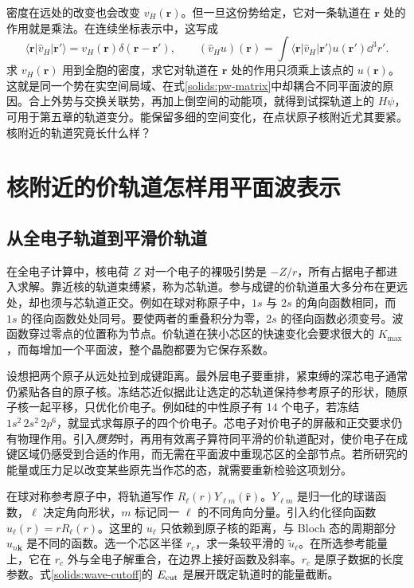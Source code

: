 密度在远处的改变也会改变 $v_H(\bm r)$。但一旦这份势给定，它对一条轨道在 $\bm r$ 处的作用就是乘法。在连续坐标表示中，这写成
\begin{equation}
 \langle\bm r|\hat v_H|\bm r'\rangle=v_H(\bm r)\delta(\bm r-\bm r'),\qquad
 (\hat v_H u)(\bm r)=\int\langle\bm r|\hat v_H|\bm r'\rangle u(\bm r')\dd^3r' .
\end{equation}
求 $v_H(\bm r)$ 用到全胞的密度，求它对轨道在 $\bm r$ 处的作用只须乘上该点的 $u(\bm r)$。这就是同一个势在实空间局域、在式\eqref{solids:pw-matrix}中却耦合不同平面波的原因。合上外势与交换关联势，再加上倒空间的动能项，就得到试探轨道上的 $H\psi$，可用于第五章的轨道变分。能保留多细的空间变化，在点状原子核附近尤其要紧。核附近的轨道究竟长什么样？

\section{核附近的价轨道怎样用平面波表示}\label{solids:core}
\subsection{从全电子轨道到平滑价轨道}
在全电子计算中，核电荷 $Z$ 对一个电子的裸吸引势是 $-Z/r$，所有占据电子都进入求解。靠近核的轨道束缚紧，称为芯轨道。参与成键的价轨道虽大多分布在更远处，却也须与芯轨道正交。例如在球对称原子中，$1s$ 与 $2s$ 的角向函数相同，而 $1s$ 的径向函数处处同号。要使两者的重叠积分为零，$2s$ 的径向函数必须变号。波函数穿过零点的位置称为节点。价轨道在狭小芯区的快速变化会要求很大的 $K_{\max}$，而每增加一个平面波，整个晶胞都要为它保存系数。

设想把两个原子从远处拉到成键距离。最外层电子要重排，紧束缚的深芯电子通常仍紧贴各自的原子核。冻结芯近似据此让选定的芯轨道保持参考原子的形状，随原子核一起平移，只优化价电子。例如硅的中性原子有 14 个电子，若冻结 $1s^2\,2s^2\,2p^6$，就显式求每原子的四个价电子。芯电子对价电子的屏蔽和正交要求仍有物理作用。引入\emph{赝势}时，再用有效离子算符同平滑的价轨道配对，使价电子在成键区域仍感受到合适的作用，而无需在平面波中重现芯区的全部节点。若所研究的能量或压力足以改变某些原先当作芯的态，就需要重新检验这项划分。

在球对称参考原子中，将轨道写作 $R_\ell(r)Y_{\ell m}(\hat{\bm r})$。$Y_{\ell m}$ 是归一化的球谐函数，$\ell$ 决定角向形状，$m$ 标记同一 $\ell$ 的不同角向分量。引入约化径向函数 $u_\ell(r)=rR_\ell(r)$。这里的 $u_\ell$ 只依赖到原子核的距离，与 Bloch 态的周期部分 $u_{n\bm k}$ 是不同的函数。选一个芯区半径 $r_c$，求一条较平滑的 $\widetilde u_\ell$。在所选参考能量上，它在 $r_c$ 外与全电子解重合，在边界上接好函数及斜率。$r_c$ 是原子数据的长度参数。式\eqref{solids:wave-cutoff}的 $E_{\rm cut}$ 是展开既定轨道时的能量截断。

